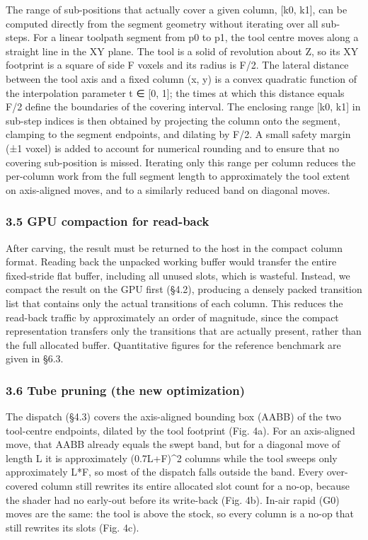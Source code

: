 \documentclass[
]{article}
\begin{document}
The range of sub-positions that actually cover a given column, {[}k0,
k1{]}, can be computed directly from the segment geometry without
iterating over all sub-steps. For a linear toolpath segment from p0 to
p1, the tool centre moves along a straight line in the XY plane. The
tool is a solid of revolution about Z, so its XY footprint is a square
of side F voxels and its radius is F/2. The lateral distance between the
tool axis and a fixed column (x, y) is a convex quadratic function of
the interpolation parameter t ∈ {[}0, 1{]}; the times at which this
distance equals F/2 define the boundaries of the covering interval. The
enclosing range {[}k0, k1{]} in sub-step indices is then obtained by
projecting the column onto the segment, clamping to the segment
endpoints, and dilating by F/2. A small safety margin (±1 voxel) is
added to account for numerical rounding and to ensure that no covering
sub-position is missed. Iterating only this range per column reduces the
per-column work from the full segment length to approximately the tool
extent on axis-aligned moves, and to a similarly reduced band on
diagonal moves.

\hypertarget{gpu-compaction-for-read-back}{%
\subsubsection{3.5 GPU compaction for
read-back}\label{gpu-compaction-for-read-back}}

After carving, the result must be returned to the host in the compact
column format. Reading back the unpacked working buffer would transfer
the entire fixed-stride flat buffer, including all unused slots, which
is wasteful. Instead, we compact the result on the GPU first (§4.2),
producing a densely packed transition list that contains only the actual
transitions of each column. This reduces the read-back traffic by
approximately an order of magnitude, since the compact representation
transfers only the transitions that are actually present, rather than
the full allocated buffer. Quantitative figures for the reference
benchmark are given in §6.3.

\hypertarget{tube-pruning-the-new-optimization}{%
\subsubsection{3.6 Tube pruning (the new
optimization)}\label{tube-pruning-the-new-optimization}}

The dispatch (§4.3) covers the axis-aligned bounding box (AABB) of the
two tool-centre endpoints, dilated by the tool footprint (Fig. 4a). For
an axis-aligned move, that AABB already equals the swept band, but for a
diagonal move of length L it is approximately (0.7L+F)\^{}2 columns
while the tool sweeps only approximately L*F, so most of the dispatch
falls outside the band. Every over-covered column still rewrites its
entire allocated slot count for a no-op, because the shader had no
early-out before its write-back (Fig. 4b). In-air rapid (G0) moves are
the same: the tool is above the stock, so every column is a no-op that
still rewrites its slots (Fig. 4c).
\end{document}
